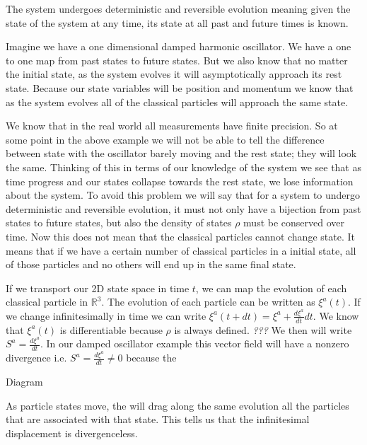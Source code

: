 \documentclass{article}
\begin{document}
\begin{assump}
	The system undergoes deterministic and reversible evolution meaning given the state of the system at any time, its state at all past and future times is known.
\end{assump}

	
	Imagine we have a one dimensional damped harmonic oscillator. We have a one to one map from past states to future states. But we also know that no matter the initial state, as the system evolves it will asymptotically approach its rest state. Because our state variables will be position and momentum we know that as the system evolves all of the classical particles will approach the same state. 
	
	We know that in the real world all measurements have finite precision. So at some point in the above example we will not be able to tell the difference between state with the oscillator barely moving and the rest state; they will look the same. Thinking of this in terms of our knowledge of the system we see that as time progress and our states collapse towards the rest state, we lose information about the system. To avoid this problem we will say that for a system to undergo deterministic and reversible evolution, it must not only have a bijection from past states to future states, but also the density of states $\rho$ must be conserved over time. Now this does not mean that the classical particles cannot change state. It means that if we have a certain number of classical particles in a initial state, all of those particles and no others will end up in the same final state.
	
	If we transport our 2D state space in time $t$, we can map the evolution of each classical particle in $\mathbb{R}^3$. The evolution of each particle can be written as $\xi^a(t)$. If we change infinitesimally in time we can write $\xi^a(t + dt) = \xi^a + \frac{d\xi^a}{dt}dt$. We know that $\xi^a(t)$ is differentiable because $\rho$ is always defined. \emph{???} We then will write $S^a = \frac{d\xi^a}{dt}$. In our damped oscillator example this vector field will have a nonzero divergence i.e. $S^a = \frac{d\xi^a}{dt} \neq 0$ because the 
	
	Diagram
	
	
	
	As particle states move, the will drag along the same evolution all the particles that are associated with that state. This tells us that the infinitesimal displacement is divergenceless.
\end{document}
